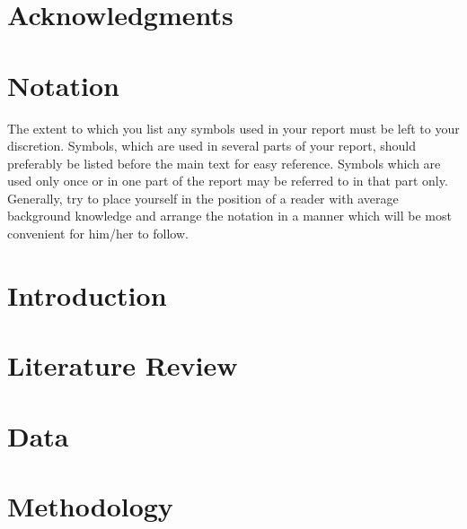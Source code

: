 \documentclass[a4paper,11]{article}
\begin{document}
\section*{Acknowledgments}
%
\blindtext
\pagebreak

\section*{Notation}
The extent to which you list any symbols used in your report must be left to your discretion. Symbols, which are used in several parts of your report, should preferably be listed before the main text for easy reference. Symbols which are used only once or in one part of the report may be referred to in that part only. Generally, try to place yourself in the position of a reader with average background knowledge and arrange the notation in a manner which will be most convenient for him/her to follow.
\pagebreak

\tableofcontents
\pagebreak
\listoffigures
\listoftables
\pagebreak
\newpage


\cleardoublepage{}

\section{Introduction}

\pagebreak

\section{Literature Review}

\pagebreak

\section{Data}

\pagebreak

\section{Methodology}

\pagebreak
\end{document}
